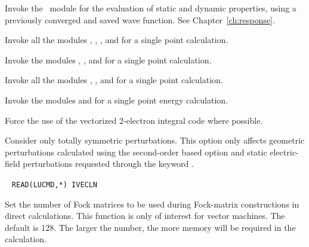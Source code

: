 \begin{description}
Invoke the \resp\ module for the evaluation of static and dynamic
properties, using a previously converged and saved wave function. See Chapter~\ref{ch:response}.

\item[\Key{RUN ALL}]

Invoke all the modules {\her}, {\sir}, {\resp}, and {\aba} for a single point
     calculation.

\item[\Key{RUN PROPERTIES}]

Invoke the modules {\her}, {\sir}, and {\aba} for a single point
calculation.

\item[\Key{RUN RESPONSE}]

Invoke all the modules {\her}, {\sir}, and {\resp} for a single point
calculation.

\item[\Key{RUN WAVE FUNCTIONS}]

Invoke the modules {\her} and {\sir} for a single point energy calculation.


\item[\Key{RUNERI}] Force the use of the vectorized 2-electron integral code {\eri} where possible.



\item[\Key{TOTSYM}] Consider only totally symmetric
perturbations.
This option only affects geometric perturbations calculated using the
second-order based  option and static
electric-field perturbations requested through the keyword .

\item[\Key{VECLEN}]\verb| |
\newline
\verb|READ(LUCMD,*) IVECLN|

Set the number of Fock matrices to be used during Fock-matrix constructions in
direct calculations. This function is only of interest for vector machines.
The default is 128. The larger the number, the more memory will be required
in the calculation.


\end{description}
